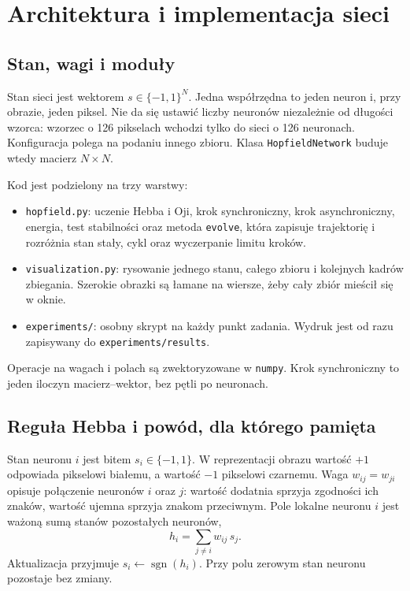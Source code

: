 \documentclass[11pt,a4paper]{article}
\begin{document}
\section{Architektura i implementacja sieci}

\subsection{Stan, wagi i moduły}
Stan sieci jest wektorem \(s \in \{-1,1\}^N\). Jedna współrzędna to jeden neuron i, przy obrazie, jeden piksel. Nie da się ustawić liczby neuronów niezależnie od długości wzorca: wzorzec o 126 pikselach wchodzi tylko do sieci o 126 neuronach. Konfiguracja polega na podaniu innego zbioru. Klasa \texttt{HopfieldNetwork} buduje wtedy macierz \(N \times N\).

Kod jest podzielony na trzy warstwy:
\begin{itemize}
    \item \texttt{hopfield.py}: uczenie Hebba i Oji, krok synchroniczny, krok asynchroniczny, energia, test stabilności oraz metoda \texttt{evolve}, która zapisuje trajektorię i rozróżnia stan stały, cykl oraz wyczerpanie limitu kroków.
    \item \texttt{visualization.py}: rysowanie jednego stanu, całego zbioru i kolejnych kadrów zbiegania. Szerokie obrazki są łamane na wiersze, żeby cały zbiór mieścił się w oknie.
    \item \texttt{experiments/}: osobny skrypt na każdy punkt zadania. Wydruk jest od razu zapisywany do \texttt{experiments/results}.
\end{itemize}
Operacje na wagach i polach są zwektoryzowane w \texttt{numpy}. Krok synchroniczny to jeden iloczyn macierz--wektor, bez pętli po neuronach.

\subsection{Reguła Hebba i powód, dla którego pamięta}
Stan neuronu \(i\) jest bitem \(s_i \in \{-1, 1\}\). W reprezentacji obrazu wartość \(+1\) odpowiada pikselowi białemu, a wartość \(-1\) pikselowi czarnemu. Waga \(w_{ij} = w_{ji}\) opisuje połączenie neuronów \(i\) oraz \(j\): wartość dodatnia sprzyja zgodności ich znaków, wartość ujemna sprzyja znakom przeciwnym. Pole lokalne neuronu \(i\) jest ważoną sumą stanów pozostałych neuronów,
\[
    h_i = \sum_{j \neq i} w_{ij}\, s_j.
\]
Aktualizacja przyjmuje \(s_i \leftarrow \operatorname{sgn}(h_i)\). Przy polu zerowym stan neuronu pozostaje bez zmiany.
\end{document}
